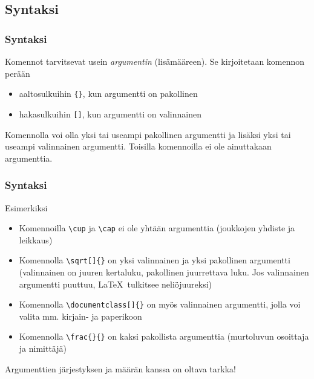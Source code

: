 \subsection{Syntaksi}
\begin{frame}[fragile]
    \frametitle{Syntaksi}
    Komennot tarvitsevat usein \textit{argumentin} (lisämääreen). \pause Se kirjoitetaan komennon perään
    \begin{itemize}[<+->]
        \item aaltosulkuihin \verb-{}-, kun argumentti on pakollinen
        \item hakasulkuihin \verb-[]-, kun argumentti on valinnainen
    \end{itemize}
    \pause
    Komennolla voi olla yksi tai useampi pakollinen argumentti ja lisäksi yksi tai useampi valinnainen argumentti. \pause Toisilla komennoilla ei ole ainuttakaan argumenttia.
\end{frame}
\begin{frame}[fragile]
    \frametitle{Syntaksi}
    Esimerkiksi 
    \begin{itemize}[<+->]
        \item Komennoilla \verb-\cup- ja \verb-\cap- ei ole yhtään argumenttia (joukkojen yhdiste ja leikkaus)
        \item Komennolla \verb-\sqrt[]{}- on yksi valinnainen ja yksi pakollinen argumentti (valinnainen on juuren kertaluku, pakollinen juurrettava luku. Jos valinnainen argumentti puuttuu, \LaTeX\ tulkitsee neliöjuureksi)
        \item Komennolla \verb-\documentclass[]{}- on myös valinnainen argumentti, jolla voi valita mm. kirjain- ja paperikoon
        \item Komennolla \verb-\frac{}{}- on kaksi pakollista argumenttia (murtoluvun osoittaja ja nimittäjä)
    \end{itemize}
    \pause
    Argumenttien järjestyksen ja määrän kanssa on oltava tarkka!
\end{frame}

